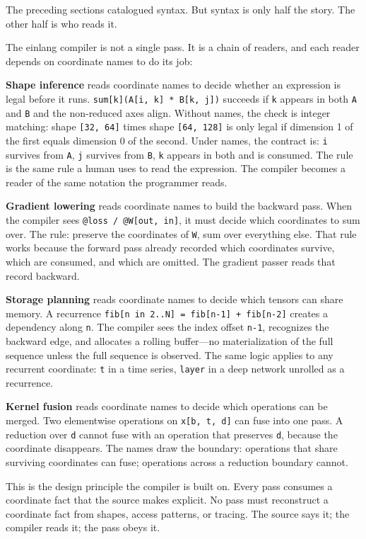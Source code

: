 \documentclass[11pt,]{article}
\begin{document}
The preceding sections catalogued syntax. But syntax is only half the
story. The other half is who reads it.

The einlang compiler is not a single pass. It is a chain of readers, and
each reader depends on coordinate names to do its job:

\textbf{Shape inference} reads coordinate names to decide whether an
expression is legal before it runs.
\texttt{sum{[}k{]}(A{[}i,\ k{]}\ *\ B{[}k,\ j{]})} succeeds if
\texttt{k} appears in both \texttt{A} and \texttt{B} and the non-reduced
axes align. Without names, the check is integer matching: shape
\texttt{{[}32,\ 64{]}} times shape \texttt{{[}64,\ 128{]}} is only legal
if dimension 1 of the first equals dimension 0 of the second. Under
names, the contract is: \texttt{i} survives from \texttt{A}, \texttt{j}
survives from \texttt{B}, \texttt{k} appears in both and is consumed.
The rule is the same rule a human uses to read the expression. The
compiler becomes a reader of the same notation the programmer reads.

\textbf{Gradient lowering} reads coordinate names to build the backward
pass. When the compiler sees \texttt{@loss\ /\ @W{[}out,\ in{]}}, it
must decide which coordinates to sum over. The rule: preserve the
coordinates of \texttt{W}, sum over everything else. That rule works
because the forward pass already recorded which coordinates survive,
which are consumed, and which are omitted. The gradient passer reads
that record backward.

\textbf{Storage planning} reads coordinate names to decide which tensors
can share memory. A recurrence
\texttt{fib{[}n\ in\ 2..N{]}\ =\ fib{[}n-1{]}\ +\ fib{[}n-2{]}} creates
a dependency along \texttt{n}. The compiler sees the index offset
\texttt{n-1}, recognizes the backward edge, and allocates a rolling
buffer---no materialization of the full sequence unless the full
sequence is observed. The same logic applies to any recurrent
coordinate: \texttt{t} in a time series, \texttt{layer} in a deep
network unrolled as a recurrence.

\textbf{Kernel fusion} reads coordinate names to decide which operations
can be merged. Two elementwise operations on \texttt{x{[}b,\ t,\ d{]}}
can fuse into one pass. A reduction over \texttt{d} cannot fuse with an
operation that preserves \texttt{d}, because the coordinate disappears.
The names draw the boundary: operations that share surviving coordinates
can fuse; operations across a reduction boundary cannot.

This is the design principle the compiler is built on. Every pass
consumes a coordinate fact that the source makes explicit. No pass must
reconstruct a coordinate fact from shapes, access patterns, or tracing.
The source says it; the compiler reads it; the pass obeys it.
\end{document}
